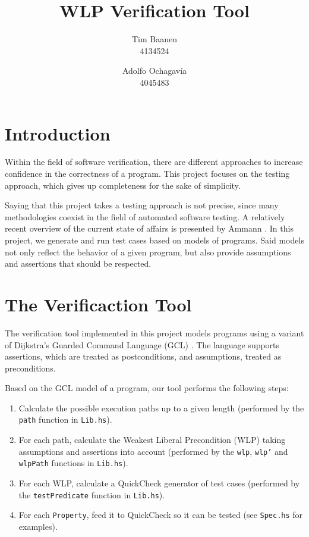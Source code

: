 \documentclass[a4paper]{article}
\author{
  Tim Baanen\\4134524
  \and
  Adolfo Ochagavía\\4045483
}
\title{WLP Verification Tool}
\begin{document}
\maketitle

\section{Introduction}

Within the field of software verification, there are different approaches to
increase confidence in the correctness of a program. This project focuses on
the testing approach, which gives up completeness for the sake of simplicity.

Saying that this project takes a testing approach is not precise,
since many methodologies coexist in the field of automated software testing. A
relatively recent overview of the current state of affairs is presented by Ammann
\cite{ammann2008introduction}. In this project, we generate and run test cases
based on models of programs. Said models not only reflect the behavior of a
given program, but also provide assumptions and assertions that should be respected.

\section{The Verificaction Tool}

The verification tool implemented in this project models programs using a
variant of Dijkstra's Guarded Command Language (GCL) \cite{Dijkstra:gcl}.
The language supports assertions, which are treated as postconditions,
and assumptions, treated as preconditions.

Based on the GCL model of a program, our tool performs the following steps:

\begin{enumerate}
\item Calculate the possible execution paths up to a given length (performed by
the \texttt{path} function in \texttt{Lib.hs}).
\item For each path, calculate the Weakest Liberal Precondition (WLP) %
taking assumptions and assertions into account (performed by the \texttt{wlp},
\texttt{wlp'} and \texttt{wlpPath} functions in \texttt{Lib.hs}).
\item For each WLP, calculate a QuickCheck \cite{claessen2011quickcheck}
generator of test cases (performed by the \texttt{testPredicate} function in
\texttt{Lib.hs}).
\item For each \texttt{Property}, feed it to QuickCheck so it can be tested (see
\texttt{Spec.hs} for examples).
\end{enumerate}
\end{document}
